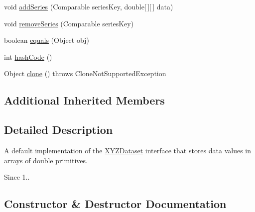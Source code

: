 \begin{DoxyCompactItemize}
\item 
void \mbox{\hyperlink{classorg_1_1jfree_1_1data_1_1xy_1_1_default_x_y_z_dataset_a356c3817c9194153f765222f75a6d5e4}{add\+Series}} (Comparable series\+Key, double\mbox{[}$\,$\mbox{]}\mbox{[}$\,$\mbox{]} data)
\item 
void \mbox{\hyperlink{classorg_1_1jfree_1_1data_1_1xy_1_1_default_x_y_z_dataset_a70beb7879083e505b730c4bdd44426c9}{remove\+Series}} (Comparable series\+Key)
\item 
boolean \mbox{\hyperlink{classorg_1_1jfree_1_1data_1_1xy_1_1_default_x_y_z_dataset_a984bc6f24ecc9b08c3d87251a543058d}{equals}} (Object obj)
\item 
int \mbox{\hyperlink{classorg_1_1jfree_1_1data_1_1xy_1_1_default_x_y_z_dataset_a6ec6b6e70f9a9befcd99300ed302b97d}{hash\+Code}} ()
\item 
Object \mbox{\hyperlink{classorg_1_1jfree_1_1data_1_1xy_1_1_default_x_y_z_dataset_ad5d91fe2bbdc63a70b5e597afd309189}{clone}} ()  throws Clone\+Not\+Supported\+Exception 
\end{DoxyCompactItemize}
\subsection*{Additional Inherited Members}


\subsection{Detailed Description}
A default implementation of the \mbox{\hyperlink{interfaceorg_1_1jfree_1_1data_1_1xy_1_1_x_y_z_dataset}{X\+Y\+Z\+Dataset}} interface that stores data values in arrays of double primitives.

\begin{DoxySince}{Since}
1.. 
\end{DoxySince}


\subsection{Constructor \& Destructor Documentation}
\mbox{\label{classorg_1_1jfree_1_1data_1_1xy_1_1_default_x_y_z_dataset_a84ab360a508deaa07e3851facef65dde}} 
